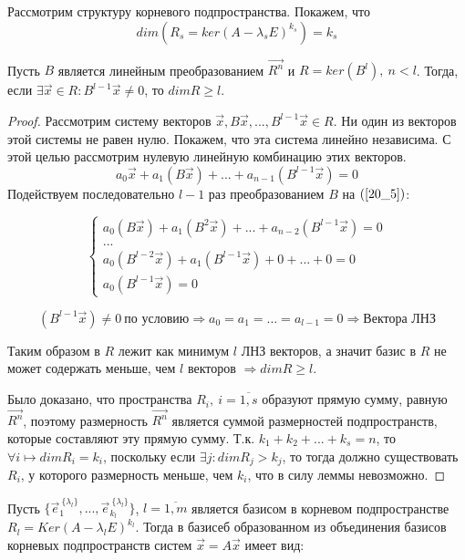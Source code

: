Рассмотрим структуру корневого подпространства. Покажем, что 
\[dim(R_s = ker(A - \lambda_s E)^{k_s}) = k_s\]

\begin{lemma}\label{lemma-20_1}
Пусть $B$ является линейным преобразованием $\vec{R^n}$ и $R = ker(B^l),~ n < l$. Тогда, если $\exists \vec{x} \in R: B^{l-1} \vec{x} \neq 0$, то $dim R \geq l$.
\begin{proof}
Рассмотрим систему векторов $\vec{x}, B\vec{x}, ..., B^{l-1} \vec{x} \in R$. Ни один из векторов этой системы не равен нулю. Покажем, что эта система линейно независима. С этой целью рассмотрим нулевую линейную комбинацию этих векторов.
\begin{equation}
a_0 \vec{x} + a_1(B \vec{x}) + ... + a_{n-1}(B^{l-1} \vec{x}) = 0
\label{20_5}
\end{equation}
Подействуем последовательно $l - 1$ раз преобразованием $B$ на $(\ref{20_5})$:

\begin{equation*}
\begin{cases}
   a_0(B \vec{x}) + a_1 (B^2 \vec{x}) + ... + a_{n-2}(B^{l-1} \vec{x}) = 0 \\
   ... \\
   a_0(B^{l-2} \vec{x}) + a_1(B^{l-1} \vec{x}) + 0 + ... + 0 = 0 \\
   a_0 (B^{l-1} \vec{x}) = 0
\end{cases}
\end{equation*}

\[(B^{l-1} \vec{x}) \neq 0 ~\text{по условию} \Rightarrow a_0 = a_1 = ... = a_{l-1} = 0 \Rightarrow \text{Вектора ЛНЗ}\]

Таким образом в $R$ лежит как минимум $l$ ЛНЗ векторов, а значит базис в $R$ не может содержать меньше, чем $l$ векторов $\Rightarrow dim R \geq l$.

Было доказано, что пространства $R_i,~ i = \overline{1,s}$ образуют прямую сумму, равную $\vec{R^n}$, поэтому размерность $\vec{R^n}$ является суммой размерностей подпространств, которые составляют эту прямую сумму. Т.к. $k_1 + k_2 + ... + k_s = n$, то $\forall i \longmapsto dim R_i = k_i$, поскольку если $\exists j: dim R_j > k_j$, то тогда должно существовать $R_i$, у которого размерность меньше, чем $k_i$, что в силу леммы невозможно.
\end{proof}
\end{lemma}

Пусть $\{\vec{e}_1^{\: \{\lambda_l\}}, ... , \vec{e}_{k_l}^{\: \{\lambda_l\}}\}$, $l = \overline{1,m}$ является базисом в корневом подпространстве $R_l = Ker (A - \lambda_l E)^{k_l}$. Тогда в базисеб образованном из объединения базисов корневых подпространств систем $\vec{x} = A \vec{x}$ имеет вид:

